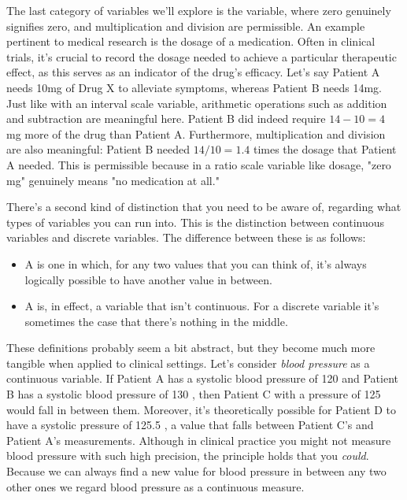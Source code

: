 
The last category of variables we'll explore is the  variable, where zero genuinely signifies zero, and multiplication and division are permissible. An example pertinent to medical research is the dosage of a medication. Often in clinical trials, it's crucial to record the dosage needed to achieve a particular therapeutic effect, as this serves as an indicator of the drug's efficacy. Let's say Patient A needs 10mg of Drug X to alleviate symptoms, whereas Patient B needs 14mg. Just like with an interval scale variable, arithmetic operations such as addition and subtraction are meaningful here. Patient B did indeed require $14 - 10 = 4$ mg more of the drug than Patient A. Furthermore, multiplication and division are also meaningful: Patient B needed $14 / 10 = 1.4$ times the dosage that Patient A needed. This is permissible because in a ratio scale variable like dosage, "zero mg" genuinely means "no medication at all."


There's a second kind of distinction that you need to be aware of, regarding what types of variables you can run into. This is the distinction between continuous variables and discrete variables. The difference between these is as follows:

\begin{itemize}
\item A  is one in which, for any two values that you can think of, it's always logically possible to have another value in between. 
\item A  is, in effect, a variable that isn't continuous. For a discrete variable it's sometimes the case that there's nothing in the middle.
\end{itemize}

These definitions probably seem a bit abstract, but they become much more tangible when applied to clinical settings. Let's consider \textit{blood pressure} as a continuous variable. If Patient A has a systolic blood pressure of 120  and Patient B has a systolic blood pressure of 130 , then Patient C with a pressure of 125  would fall in between them. Moreover, it's theoretically possible for Patient D to have a systolic pressure of 125.5 , a value that falls between Patient C's and Patient A's measurements. Although in clinical practice you might not measure blood pressure with such high precision, the principle holds that you \textit{could}. Because we can always find a new value for blood pressure in between any two other ones we regard blood pressure as a continuous measure.

